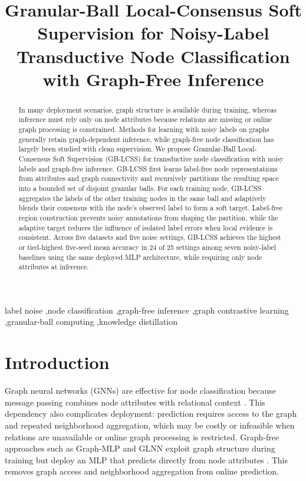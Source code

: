 \documentclass[10pt,letterpaper]{elsarticle}
\begin{document}
\begin{frontmatter}
\title{Granular-Ball Local-Consensus Soft Supervision for Noisy-Label Transductive Node Classification with Graph-Free Inference}
\begin{abstract}
In many deployment scenarios, graph structure is available during training, whereas inference must rely only on node attributes because relations are missing or online graph processing is constrained. Methods for learning with noisy labels on graphs generally retain graph-dependent inference, while graph-free node classification has largely been studied with clean supervision. We propose Granular-Ball Local-Consensus Soft Supervision (GB-LCSS) for transductive node classification with noisy labels and graph-free inference. GB-LCSS first learns label-free node representations from attributes and graph connectivity and recursively partitions the resulting space into a bounded set of disjoint granular balls. For each training node, GB-LCSS aggregates the labels of the other training nodes in the same ball and adaptively blends their consensus with the node's observed label to form a soft target. Label-free region construction prevents noisy annotations from shaping the partition, while the adaptive target reduces the influence of isolated label errors when local evidence is consistent. Across five datasets and five noise settings, GB-LCSS achieves the highest or tied-highest five-seed mean accuracy in 24 of 25 settings among seven noisy-label baselines using the same deployed MLP architecture, while requiring only node attributes at inference.
\end{abstract}
\begin{keyword}
label noise \sep node classification \sep graph-free inference \sep graph contrastive learning \sep granular-ball computing \sep knowledge distillation
\end{keyword}
\end{frontmatter}


\FloatBarrier

\section{Introduction}\label{sec:1}

Graph neural networks (GNNs) are effective for node classification because message passing combines node attributes with relational context \cite{ref1,ref2}. This dependency also complicates deployment: prediction requires access to the graph and repeated neighborhood aggregation, which may be costly or infeasible when relations are unavailable or online graph processing is restricted. Graph-free approaches such as Graph-MLP and GLNN exploit graph structure during training but deploy an MLP that predicts directly from node attributes \cite{ref3,ref4}. This removes graph access and neighborhood aggregation from online prediction.
\end{document}
